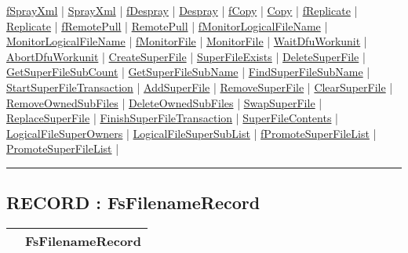 \hyperlink{ecldoc:file.fsprayxml}{fSprayXml}  |
\hyperlink{ecldoc:file.sprayxml}{SprayXml}  |
\hyperlink{ecldoc:file.fdespray}{fDespray}  |
\hyperlink{ecldoc:file.despray}{Despray}  |
\hyperlink{ecldoc:file.fcopy}{fCopy}  |
\hyperlink{ecldoc:file.copy}{Copy}  |
\hyperlink{ecldoc:file.freplicate}{fReplicate}  |
\hyperlink{ecldoc:file.replicate}{Replicate}  |
\hyperlink{ecldoc:file.fremotepull}{fRemotePull}  |
\hyperlink{ecldoc:file.remotepull}{RemotePull}  |
\hyperlink{ecldoc:file.fmonitorlogicalfilename}{fMonitorLogicalFileName}  |
\hyperlink{ecldoc:file.monitorlogicalfilename}{MonitorLogicalFileName}  |
\hyperlink{ecldoc:file.fmonitorfile}{fMonitorFile}  |
\hyperlink{ecldoc:file.monitorfile}{MonitorFile}  |
\hyperlink{ecldoc:file.waitdfuworkunit}{WaitDfuWorkunit}  |
\hyperlink{ecldoc:file.abortdfuworkunit}{AbortDfuWorkunit}  |
\hyperlink{ecldoc:file.createsuperfile}{CreateSuperFile}  |
\hyperlink{ecldoc:file.superfileexists}{SuperFileExists}  |
\hyperlink{ecldoc:file.deletesuperfile}{DeleteSuperFile}  |
\hyperlink{ecldoc:file.getsuperfilesubcount}{GetSuperFileSubCount}  |
\hyperlink{ecldoc:file.getsuperfilesubname}{GetSuperFileSubName}  |
\hyperlink{ecldoc:file.findsuperfilesubname}{FindSuperFileSubName}  |
\hyperlink{ecldoc:file.startsuperfiletransaction}{StartSuperFileTransaction}  |
\hyperlink{ecldoc:file.addsuperfile}{AddSuperFile}  |
\hyperlink{ecldoc:file.removesuperfile}{RemoveSuperFile}  |
\hyperlink{ecldoc:file.clearsuperfile}{ClearSuperFile}  |
\hyperlink{ecldoc:file.removeownedsubfiles}{RemoveOwnedSubFiles}  |
\hyperlink{ecldoc:file.deleteownedsubfiles}{DeleteOwnedSubFiles}  |
\hyperlink{ecldoc:file.swapsuperfile}{SwapSuperFile}  |
\hyperlink{ecldoc:file.replacesuperfile}{ReplaceSuperFile}  |
\hyperlink{ecldoc:file.finishsuperfiletransaction}{FinishSuperFileTransaction}  |
\hyperlink{ecldoc:file.superfilecontents}{SuperFileContents}  |
\hyperlink{ecldoc:file.logicalfilesuperowners}{LogicalFileSuperOwners}  |
\hyperlink{ecldoc:file.logicalfilesupersublist}{LogicalFileSuperSubList}  |
\hyperlink{ecldoc:file.fpromotesuperfilelist}{fPromoteSuperFileList}  |
\hyperlink{ecldoc:file.promotesuperfilelist}{PromoteSuperFileList}  |

\rule{\textwidth}{0.4pt}

\subsection*{RECORD : FsFilenameRecord}
\hypertarget{ecldoc:file.fsfilenamerecord}{}

{\renewcommand{\arraystretch}{1.5}
\begin{tabularx}{\textwidth}{|>{\raggedright\arraybackslash}l|X|}
\hline
\hspace{0pt} & FsFilenameRecord \\
\hline
\end{tabularx}
}

